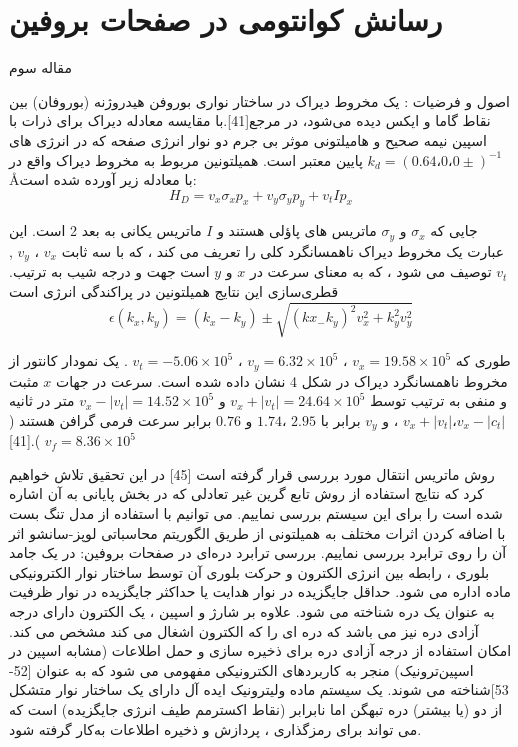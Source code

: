 \section{رسانش کوانتومی در صفحات بروفین}
مقاله سوم


اصول و فرضيات :
یک مخروط دیراک در ساختار نواری بوروفن هیدروژنه (بوروفان) بین نقاط گاما و ایکس دیده می‌شود، در مرجع[41].با مقایسه معادله دیراک برای ذرات با اسپین نیمه صحیح و هامیلتونی موثر بی جرم دو نوار انرژی صفحه که در انرژی های پایین معتبر است. همیلتونین مربوط به مخروط دیراک واقع در $k_d = (0.64،0،0 ±)^{-1}$\AA با معادله زیر آورده شده است:
$$
H_D = v_x \sigma_x p_x + v_y \sigma_y p_y + v_t I p_x
$$

جایی که $\sigma_x$ و $\sigma_y$ ماتریس های پاؤلی هستند و $I$ ماتریس یکانی به بعد 2 است. این عبارت یک مخروط دیراک  ناهمسانگرد کلی را تعریف می کند ، که با سه ثابت $v_x$ ، $v_y$ , $v_t$ توصیف می شود ، که به معنای سرعت در $x$ و $y$ است جهت و درجه شیب به ترتیب. قطری‌سازی این نتایج همیلتونین در پراکندگی انرژی است
$$
\epsilon(k_x,k_y) = (k_x - k_y) \pm \sqrt{(kx_ -k_y)^2 v_x^2 + k_y^2 v_y^2}
$$

طوری که $v_x = 19.58\times 10^5$  ، $v_y = 6.32\times 10^5$  ، $v_t = -5.06\times 10^5$ . یک نمودار کانتور از مخروط ناهمسانگرد دیراک در شکل 4 نشان داده شده است. سرعت در جهات $x$ مثبت و منفی به ترتیب توسط $v_x + | v_t | = 24.64 \times 10^5$   و $v_x - | v_t | = 14.52 \times 10^5$ متر در ثانیه $v_x + | v_t | ، v_x - | c_t|$ ، و $v_y$ برابر با $2.95$ ،$ 1.74$ و $0.76$ برابر سرعت فرمی گرافن هستند ($v_f =8.36\times 10^5$  ).[41]

روش ماتریس انتقال مورد بررسی قرار گرفته است [45] در این تحقیق تلاش خواهیم کرد که نتایج استفاده از روش تابع گرین غیر تعادلی که در بخش پایانی به آن اشاره شده است را برای این سیستم بررسی نماییم. می توانیم با استفاده از مدل تنگ بست با اضافه کردن اثرات مختلف به همیلتونی از طریق الگوریتم محاسباتی لوپز-سانشو اثر آن را روی ترابرد بررسی نماییم.
بررسی ترابرد دره‌ای در صفحات بروفین:
در یک جامد بلوری ، رابطه بین انرژی الکترون و حرکت بلوری آن توسط ساختار نوار الکترونیکی ماده اداره می شود. حداقل جایگزیده در نوار هدایت یا حداکثر جایگزیده در نوار ظرفیت به عنوان یک دره شناخته می شود. علاوه بر شارژ و اسپین ، یک الکترون دارای درجه آزادی دره نیز می باشد که دره ای را که الکترون اشغال می کند مشخص می کند. امکان استفاده از درجه آزادی دره برای ذخیره سازی و حمل اطلاعات (مشابه اسپین در اسپین‌ترونیک) منجر به کاربردهای الکترونیکی مفهومی می شود که به عنوان  [52-53]شناخته می شوند. یک سیستم ماده ولیترونیک ایده آل دارای یک ساختار نوار متشکل از دو (یا بیشتر) دره تبهگن اما نابرابر (نقاط اکسترمم طیف انرژی جایگزیده) است که می تواند برای رمزگذاری ، پردازش و ذخیره اطلاعات به‌کار گرفته شود.

